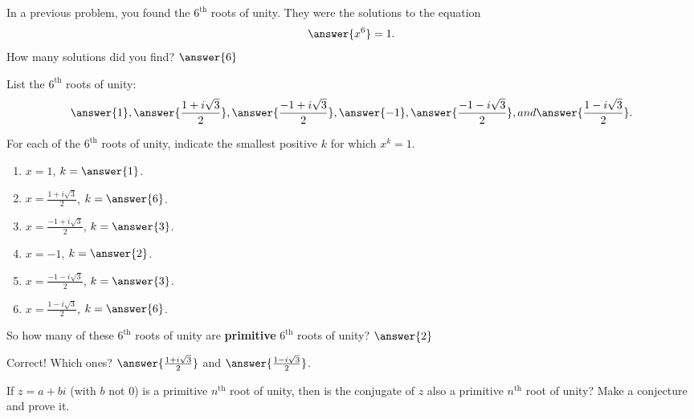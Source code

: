 \documentclass[space,nooutcomes]{ximera}
\begin{document}
\begin{problem}
In a previous problem, you found the $6^\text{th}$ roots of unity.  They were the solutions to the equation
\[
\answer{x^6} = 1.  
\]
How many solutions did you find?  $\answer{6}$
\begin{problem}
List the $6^\text{th}$ roots of unity: 
\[
\answer{1}, \answer{\frac{1+i\sqrt{3}}{2}}, \answer{\frac{-1+i\sqrt{3}}{2}}, 
\answer{-1}, \answer{\frac{-1-i\sqrt{3}}{2}}, and \answer{\frac{1-i\sqrt{3}}{2}}. 
\]
\begin{problem}
For each of the $6^\text{th}$ roots of unity, indicate the smallest positive $k$ for which $x^k = 1$.  
\begin{enumerate}
\item $x=1$, $k=\answer{1}$.  
\item $x=\frac{1+i\sqrt{3}}{2}$, $k=\answer{6}$.
\item $x=\frac{-1+i\sqrt{3}}{2}$, $k=\answer{3}$.
\item $x=-1$, $k=\answer{2}$.  
\item $x=\frac{-1-i\sqrt{3}}{2}$, $k=\answer{3}$.
\item $x=\frac{1-i\sqrt{3}}{2}$, $k=\answer{6}$.
\end{enumerate}
So how many of these $6^\text{th}$ roots of unity are \textbf{primitive} $6^\text{th}$ roots of unity?  
$\answer{2}$
\begin{problem}
Correct!  Which ones?  $\answer{\frac{1+i\sqrt{3}}{2}}$ and $\answer{\frac{1-i\sqrt{3}}{2}}$.  
\end{problem}
\end{problem}
\end{problem}
\end{problem}



\begin{problem}
If $z = a + bi$ (with $b$ not $0$) is a primitive $n^\text{th}$ root of unity, then is the conjugate of $z$ also a primitive $n^\text{th}$ root of unity?  Make a conjecture and prove it.
\vfill 
\end{problem}
\end{document}
